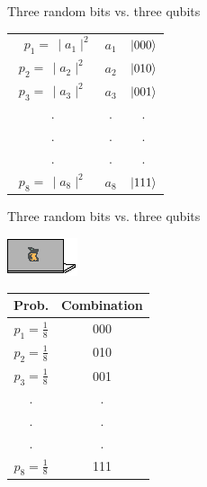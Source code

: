 \documentclass[10pt]{beamer}
\begin{document}
{\begin{frame}[fragile]{Three random bits vs. three qubits}
\begin{minipage}[c]{0.59\textwidth}
\begin{tabular}{c | c | c}
\
	\midrule
	$p_1 =\, \mid a_1\mid^2$ & $a_1$ & $\ket{000}$ \\
	$p_2 =\,\mid a_2\mid^2$ & $a_2$ & $\ket{010}$ \\
	$p_3 =\, \mid a_3\mid^2$ & $a_3$ & $\ket{001}$ \\
	. & .  & .\\
	. & . & .\\
	. & . & .\\
	$p_8 =\, \mid a_8\mid^2$ & $a_8$ & $\ket{111}$ \\
	
\end{tabular}
\end{minipage}
\end{frame}
}

{
\begin{frame}[fragile]{Three random bits vs. three qubits}

\begin{minipage}[c]{0.39\textwidth}
\centering
\includegraphics[scale=1.9]{Vectors/laptop_c.eps}\\
\vspace{0.4cm}
\begin{tabular}{c | c}
	Prob. & Combination \\
	\midrule
	$p_1 = \frac{1}{8}$ & 000 \\
	$p_2= \frac{1}{8}$ & 010 \\
	$p_3= \frac{1}{8}$ & 001 \\
	. & .\\
	. & . \\
	. & . \\
	$p_8= \frac{1}{8}$ & 111 \\
	

\end{tabular}
\end{minipage}
\end{frame}}
\end{document}
